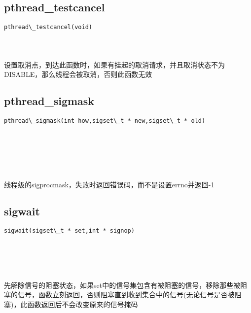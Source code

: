 \documentclass[10pt,a4paper]{article}
\begin{document}
\subsection{pthread\_testcancel}
\begin{spacing}{2.0}
\lstset{language=C,numbers=none}
\begin{lstlisting}
pthread\_testcancel(void)
\end{lstlisting}
{\large\color[rgb]{0.2,0.4,0.6}{void:}}
\paragraph{ \ \ }设置取消点，到达此函数时，如果有挂起的取消请求，并且取消状态不为DISABLE，那么线程会被取消，否则此函数无效
\end{spacing}

\subsection{pthread\_sigmask}
\begin{spacing}{2.0}
\lstset{language=C,numbers=none}
\begin{lstlisting}
pthread\_sigmask(int how,sigset\_t * new,sigset\_t * old)
\end{lstlisting}
{\large\color[rgb]{0.2,0.4,0.6}{how:}} \\
{\large\color[rgb]{0.2,0.4,0.6}{new:}} \\
{\large\color[rgb]{0.2,0.4,0.6}{old:}}
\paragraph{ \ \ }线程级的sigprocmask，失败时返回错误码，而不是设置errno并返回-1
\end{spacing}

\subsection{sigwait}
\begin{spacing}{2.0}
\lstset{language=C,numbers=none}
\begin{lstlisting}
sigwait(sigset\_t * set,int * signop)
\end{lstlisting}
{\large\color[rgb]{0.2,0.4,0.6}{set:}} \\
{\large\color[rgb]{0.2,0.4,0.6}{signop:}}
\paragraph{ \ \ }先解除信号的阻塞状态，如果set中的信号集包含有被阻塞的信号，移除那些被阻塞的信号，函数立刻返回，否则阻塞直到收到集合中的信号(无论信号是否被阻塞)，此函数返回后不会改变原来的信号掩码
\end{spacing}
\end{document}
